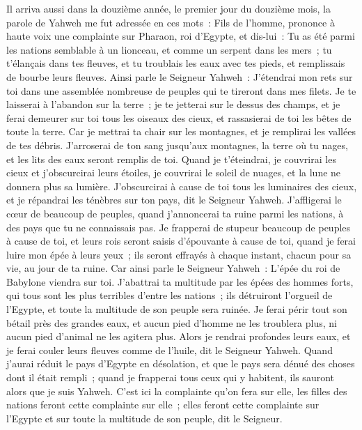 \begin{multicols}{2}
\VerseOne{}Il arriva aussi dans la douzième année, le premier jour du douzième mois, la parole de Yahweh me fut adressée en ces mots~:
Fils de l'homme, prononce à haute voix une complainte sur Pharaon, roi d'Egypte, et dis-lui~: Tu as été parmi les nations semblable à un lionceau, et comme un serpent dans les mers~; tu t'élançais dans tes fleuves, et tu troublais les eaux avec tes pieds, et remplissais de bourbe leurs fleuves.
Ainsi parle le Seigneur Yahweh~: J'étendrai mon rets sur toi dans une assemblée nombreuse de peuples qui te tireront dans mes filets.
Je te laisserai à l'abandon sur la terre~; je te jetterai sur le dessus des champs, et je ferai demeurer sur toi tous les oiseaux des cieux, et rassasierai de toi les bêtes de toute la terre.
Car je mettrai ta chair sur les montagnes, et je remplirai les vallées de tes débris.
J'arroserai de ton sang jusqu'aux montagnes, la terre où tu nages, et les lits des eaux seront remplis de toi.
Quand je t'éteindrai, je couvrirai les cieux et j'obscurcirai leurs étoiles, je couvrirai le soleil de nuages, et la lune ne donnera plus sa lumière.
J'obscurcirai à cause de toi tous les luminaires des cieux, et je répandrai les ténèbres sur ton pays, dit le Seigneur Yahweh.
J'affligerai le cœur de beaucoup de peuples, quand j'annoncerai ta ruine parmi les nations, à des pays que tu ne connaissais pas.
Je frapperai de stupeur beaucoup de peuples à cause de toi, et leurs rois seront saisis d'épouvante à cause de toi, quand je ferai luire mon épée à leurs yeux~; ils seront effrayés à chaque instant, chacun pour sa vie, au jour de ta ruine.
Car ainsi parle le Seigneur Yahweh~: L'épée du roi de Babylone viendra sur toi.
J'abattrai ta multitude par les épées des hommes forts, qui tous sont les plus terribles d'entre les nations~; ils détruiront l'orgueil de l'Egypte, et toute la multitude de son peuple sera ruinée.
Je ferai périr tout son bétail près des grandes eaux, et aucun pied d'homme ne les troublera plus, ni aucun pied d'animal ne les agitera plus.
Alors je rendrai profondes leurs eaux, et je ferai couler leurs fleuves comme de l'huile, dit le Seigneur Yahweh.
Quand j'aurai réduit le pays d'Egypte en désolation, et que le pays sera dénué des choses dont il était rempli~; quand je frapperai tous ceux qui y habitent, ils sauront alors que je suis Yahweh.
C'est ici la complainte qu'on fera sur elle, les filles des nations feront cette complainte sur elle~; elles feront cette complainte sur l'Egypte et sur toute la multitude de son peuple, dit le Seigneur.

\end{multicols}
